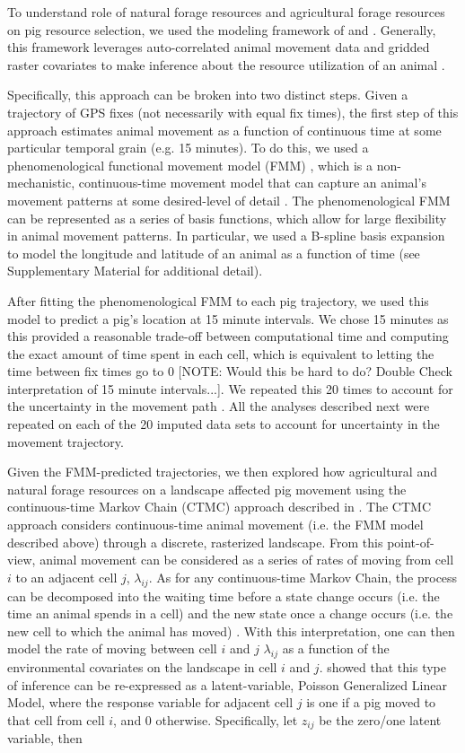 \documentclass[a4paper]{article}
\begin{document}
To understand role of natural forage resources and agricultural forage resources on pig resource selection, we used the modeling framework of \cite{Hanks2015} and \cite{Wilson2018}.  Generally, this framework leverages auto-correlated animal movement data and gridded raster covariates to make inference about the resource utilization of an animal \citep{Hanks2015,Buderman2018,Wilson2018}.  

Specifically, this approach can be broken into two distinct steps. Given a trajectory of GPS fixes (not necessarily with equal fix times), the first step of this approach estimates animal movement as a function of continuous time at some particular temporal grain (e.g. 15 minutes).  To do this, we used a phenomenological functional movement model (FMM) \citep{Buderman2016,Hooten2017a}, which is a non-mechanistic, continuous-time movement model that can capture an animal's movement patterns at some desired-level of detail \citep{Buderman2016}.  The phenomenological FMM can be represented as a series of basis functions, which allow for large flexibility in animal movement patterns.
In particular, we used a B-spline basis expansion to model the longitude and latitude of an animal as a function of time (see Supplementary Material for additional detail).

After fitting the phenomenological FMM to each pig trajectory, we used this model to predict a pig's location at 15 minute intervals. We chose 15 minutes as this provided a reasonable trade-off between computational time and computing the exact amount of time spent in each cell, which is equivalent to letting the time between fix times go to 0 [NOTE: Would this be hard to do? Double Check interpretation of 15 minute intervals...]. We repeated this 20 times to account for the uncertainty in the movement path \citep{Hanks2015,Buderman2018}.  All the analyses described next were repeated on each of the 20 imputed data sets to account for uncertainty in the movement trajectory.

Given the FMM-predicted trajectories, we then explored how agricultural and natural forage resources on a landscape affected pig movement using the continuous-time Markov Chain (CTMC) approach described in \cite{Hanks2015}. The CTMC approach considers continuous-time animal movement (i.e. the FMM model described above) through a discrete, rasterized landscape. From this point-of-view, animal movement can be considered as a series of rates of moving from cell $i$ to an adjacent cell $j$, $\lambda_{ij}$.  As for any continuous-time Markov Chain, the process can be decomposed into the waiting time before a state change occurs (i.e. the time an animal spends in a cell) and the new state once a change occurs (i.e. the new cell to which the animal has moved) \citep{Allen2003a}.  With this interpretation, one can then model the rate of moving between cell $i$ and $j$ $\lambda_{ij}$ as a function of the environmental covariates on the landscape in cell $i$ and $j$.  \cite{Hanks2015} showed that this type of inference can be re-expressed as a latent-variable, Poisson Generalized Linear Model, where the response variable for adjacent cell $j$ is one if a pig moved to that cell from cell $i$, and 0 otherwise. Specifically, let $z_{ij}$ be the zero/one latent variable, then
\end{document}

